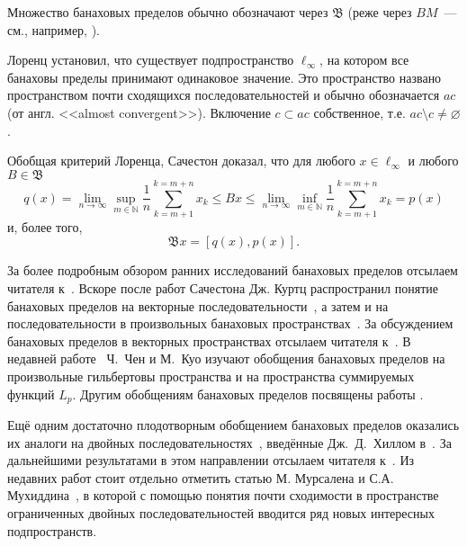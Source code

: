 Множество банаховых пределов обычно обозначают через $\mathfrak{B}$
(реже через $BM$~--- см., например, \cite{alekhno2012superposition,alekhno2015banach}).

Лоренц \cite{lorentz1948contribution} установил, что существует подпространство $\ell_\infty$,
на котором все банаховы пределы принимают одинаковое значение.
Это пространство названо пространством почти сходящихся последовательностей и обычно обозначается $ac$
(от англ. <<almost convergent>>).
Включение $c \subset ac$ собственное, т.е. $ac \setminus c \neq \varnothing$.


Обобщая критерий Лоренца, Сачестон \cite{sucheston1967banach} доказал, что для любого $x\in\ell_\infty$
и любого $B\in\mathfrak{B}$
\begin{equation*}
	q(x) =
	\lim_{n\to\infty} \sup_{m\in\mathbb{N}} \frac{1}{n} \sum_{k=m+1}^{k=m+n} x_k
	\leq
	Bx
	\leq
	\lim_{n\to\infty} \inf_{m\in\mathbb{N}} \frac{1}{n} \sum_{k=m+1}^{k=m+n} x_k
	= p(x)
\end{equation*}
и, более того,
\begin{equation*}
	\mathfrak{B}x = [q(x), p(x)]
	.
\end{equation*}


За более подробным обзором ранних исследований банаховых пределов отсылаем читателя к~\cite{greenleaf1969invariant,day1973normed,kangro1976theory}.
Вскоре после работ Сачестона Дж. Куртц распространил понятие банаховых пределов
на векторные последовательности~\cite{kurtz1970almost},
а затем и на последовательности в произвольных банаховых пространствах~\cite{kurtz1972almost}.
За обсуждением банаховых пределов в векторных пространствах отсылаем читателя
к~\cite{deeds1968summability,hajdukovic1975almost,armario2013vectorvalued_rus,garcia2015extremal,garcia2016fundamental_rus}.
В недавней работе~\cite{chen2007characterizations} Ч.~Чен и М.~Куо изучают обобщения банаховых пределов
на произвольные гильбертовы пространства и на пространства суммируемых функций $L_p$.
Другим обобщениям банаховых пределов посвящены работы
\cite{hajdukovic1975functionals,koga2016generalization}.

Ещё одним достаточно плодотворным обобщением банаховых пределов оказались их аналоги на двойных последовательностях~\cite{robison1926divergent}, введённые Дж.~Д.~Хиллом в~\cite{hill1965almost}.
За дальнейшими результатами в этом направлении отсылаем читателя
к~\cite{moricz1988almost,bacsarir1995strong,mursaleen2003almost,edely2004almost,mursaleen2004almost}.
Из недавних работ стоит отдельно отметить статью М. Мурсалена и С.А. Мухиддина~\cite{mursaleen2012banach},
в которой с помощью понятия почти сходимости в пространстве ограниченных двойных последовательностей вводится ряд новых интересных подпространств.

